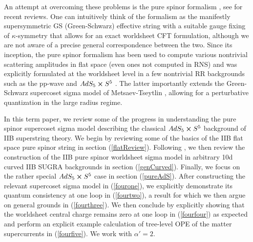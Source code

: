 \documentclass[12pt]{article}
\numberwithin{equation}{section}
\begin{document}
An attempt at overcoming these problems is the pure spinor formalism \cite{Berkovits:2000fe, Berkovits:2000wm, Berkovits:2002zk}, see \cite{Berkovits:2022fth, Mafra:2022wml} for recent reviews. One can intuitively think of the formalism as the manifestly supersymmetric GS (Green-Schwarz) effective string with a suitable gauge fixing of $\kappa$-symmetry that allows for an exact worldsheet CFT formulation, although we are not aware of a precise general correspondence between the two. Since its inception, the pure spinor formalism has been used to compute various nontrivial scattering amplitudes in flat space (even ones not computed in RNS) and was explicitly formulated at the worldsheet level in a few nontrivial RR backgrounds such as the pp-wave \cite{Berkovits:2002zv} and $AdS_5 \cross S^5$ \cite{Berkovits:2000fe, Berkovits:2000wm, Berkovits:2000yr, Berkovits:2004xu, Berkovits:2008ga, Mazzucato:2011jt, Berkovits:2019rwq}. The latter importantly extends the Green-Schwarz supercoset sigma model of Metsaev-Tseytlin \cite{Metsaev:1998it}, allowing for a perturbative quantization in the large radius regime.

In this term paper, we review some of the progress in understanding the pure spinor supercoset sigma model describing the classical $AdS_5 \cross S^5$ background of IIB superstring theory. We begin by reviewing some of the basics of the IIB flat space pure spinor string in section (\ref{flatReview}). Following \cite{Berkovits:2001ue}, we then review the construction of the IIB pure spinor worldsheet sigma model in arbitrary 10d curved IIB SUGRA backgrounds in section (\ref{genCurved}). Finally, we focus on the rather special $AdS_5 \cross S^5$ case in section (\ref{pureAdS}). After constructing the relevant supercoset sigma model in (\ref{fourone}), we explicitly demonstrate its quantum consistency at one loop in (\ref{fourtwo}), a result for which we then argue on general grounds in (\ref{fourthree}). We then conclude by explicitly showing that the worldsheet central charge remains zero at one loop in (\ref{fourfour}) as expected and perform an explicit example calculation of tree-level OPE of the matter supercurrents in (\ref{fourfive}). We work with $\alpha' = 2$.
\end{document}
